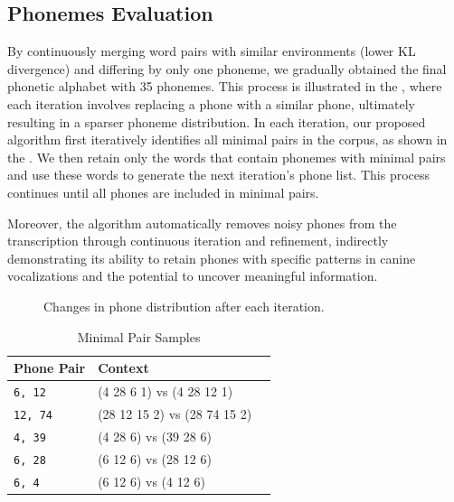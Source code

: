 \subsection{Phonemes Evaluation}

By continuously merging word pairs with similar environments (lower KL divergence) and differing by only one phoneme, we gradually obtained the final phonetic alphabet with 35 phonemes. This process is illustrated in the , where each iteration involves replacing a phone with a similar phone, ultimately resulting in a sparser phoneme distribution. In each iteration, our proposed algorithm first iteratively identifies all minimal pairs in the corpus, as shown in the . We then retain only the words that contain phonemes with minimal pairs and use these words to generate the next iteration's phone list. This process continues until all phones are included in minimal pairs.

Moreover, the algorithm automatically removes noisy phones from the transcription through continuous iteration and refinement, indirectly demonstrating its ability to retain phones with specific patterns in canine vocalizations and the potential to uncover meaningful information.

\begin{figure}[h]
    \centering
    \caption{Changes in phone distribution after each iteration.}
    \label{fig:clusters}
\end{figure}

\begin{table}[th]
\centering
\small
\begin{tabular}{lll}
\hline
\textbf{Phone Pair} & \textbf{Context}\\
\hline
\verb|6, 12| & (4 28 6 1) vs (4 28 12 1)  \\
\verb|12, 74| & (28 12 15 2) vs (28 74 15 2) \\
\verb|4, 39| & (4 28 6) vs (39 28 6) \\
\verb|6, 28| & (6 12 6) vs (28 12 6) \\
\verb|6, 4| &(6 12 6) vs (4 12 6) \\\hline
\end{tabular}
\caption{Minimal Pair Samples}
\label{tab:mps}
\end{table}

